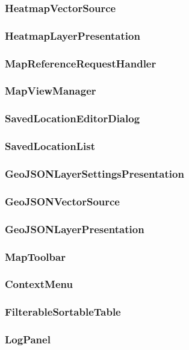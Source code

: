 \subsubsection{HeatmapVectorSource}
\subsubsection{HeatmapLayerPresentation}

\subsubsection{MapReferenceRequestHandler}
\subsubsection{MapViewManager}
\subsubsection{SavedLocationEditorDialog}
\subsubsection{SavedLocationList}

\subsubsection{GeoJSONLayerSettingsPresentation}
\subsubsection{GeoJSONVectorSource}
\subsubsection{GeoJSONLayerPresentation}

\subsubsection{MapToolbar}
\subsubsection{ContextMenu}

\subsubsection{FilterableSortableTable}
\subsubsection{LogPanel}


